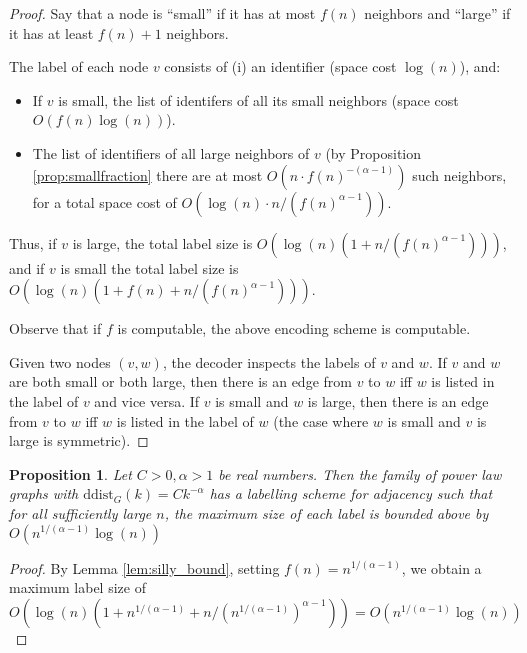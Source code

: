 \documentclass{article}
\newtheorem{proposition}{Proposition}
\begin{document}
\begin{proof}
Say that a node is ``small'' if it has at most $f(n)$ neighbors and ``large'' if it has
at least $f(n) + 1$ neighbors.

The label of each node $v$ consists of (i) an identifier (space cost $\log(n)$), and:

\begin{itemize}

\item If $v$ is small, the list of identifers of all its small neighbors (space cost $O(f(n)\log(n))$).

\item The list of identifiers of all large neighbors of $v$ (by Proposition \ref{prop:smallfraction}
there are at most $O(n \cdot f(n)^{-(\alpha -1)})$ such neighbors, for a total space cost
of $O(\log(n) \cdot n/(f(n)^{\alpha - 1}))$.

\end{itemize}

Thus, if $v$ is large, the total label size is $O(\log(n) (1 + n/(f(n)^{\alpha - 1})))$,
and if $v$ is small the total label size is $O(\log(n)(1 + f(n) + n/(f(n)^{\alpha - 1})))$.

Observe that if $f$ is computable, the above encoding scheme is computable.

Given two nodes $(v,w)$, the decoder inspects the labels of $v$ and $w$. If $v$ and $w$
are both small or both large, then there is an edge from $v$ to $w$ if{f} $w$ is listed in the label of $v$ and vice versa.
If $v$ is small and $w$ is large, then there is an edge from $v$ to $w$ if{f} $w$ is listed in the label of $w$
(the case where $w$ is small and $v$ is large is symmetric).
\end{proof}



\begin{proposition}\label{prop:naive_bound}
Let $C > 0, \alpha > 1$ be real numbers. Then the family of power law graphs
with $\mathrm{ddist}_G(k) = C k^{-\alpha}$ has a labelling scheme for adjacency
such that for all sufficiently large $n$, the maximum size of each label
is bounded above by $O(n^{1/(\alpha - 1)} \log(n))$
\end{proposition}

\begin{proof}
By Lemma \ref{lem:silly_bound}, setting $f(n) = n^{1/(\alpha - 1)}$,
we obtain a maximum label size of 
$O(\log(n) (1 + n^{1/(\alpha - 1)} + n/(n^{1/(\alpha - 1)})^{\alpha - 1})) = O(n^{1/(\alpha - 1)} \log(n))$
\end{proof}
\end{document}

